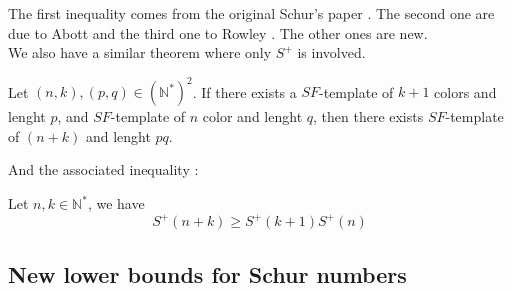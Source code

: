 The first inequality comes from the original Schur's paper \cite{Schur1917}. The second one are due to
Abott \cite{AbbottHanson}
and the third one to Rowley \cite{RowleyRamsey}. The other ones are new. \\

We also have a similar theorem where only \(S^+\) is involved.

\begin{theorem}
	Let \((n,k), (p,q) \in (\mathbb{N}^*)^2\). If there exists a \(SF\)-template of \(k+1\) colors and lenght \(p\),
	and \(SF\)-template of \(n\) color and lenght \(q\), then there exists \(SF\)-template of \((n+k)\) and lenght \(pq\).
\end{theorem}

And the associated inequality :

\begin{corollary}
	Let \(n, k \in \mathbb{N}^*\), we have \\
	\[ S^+(n+k) \geqslant S^+(k+1)S^+(n) \]
\end{corollary}


\subsection{New lower bounds for Schur numbers}

